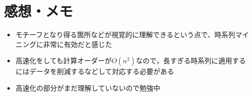 \documentclass{jsarticle}
\begin{document}
\section{感想・メモ}
\begin{itemize}
	\item モチーフとなり得る箇所などが視覚的に理解できるという点で、時系列マイニングに非常に有効だと感じた
	\item 高速化をしても計算オーダーが$O(n^2)$なので，長すぎる時系列に適用するにはデータを削減するなどして対応する必要がある
	\item 高速化の部分がまだ理解していないので勉強中
\end{itemize}
\end{document}
